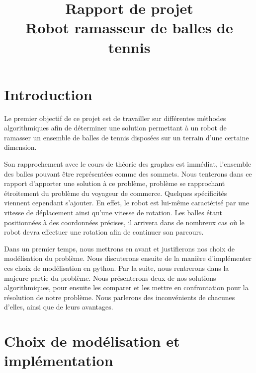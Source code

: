 \documentclass[12pt]{article}
\title{Rapport de projet \\ \textbf{Robot ramasseur de balles de tennis}}
\author{}
\date{}
\begin{document}
    \begin{titlepage}

        \begin{figure}
            \centering
            
        \end{figure}
        \maketitle

    \end{titlepage}

    \tableofcontents
    \pagebreak
    
    \section{Introduction}
    \label{sec:intro}

    Le premier objectif de ce projet est de travailler sur différentes méthodes algorithmiques afin de déterminer une solution permettant à un robot de ramasser un ensemble de balles de tennis disposées sur un terrain d'une certaine dimension.

    Son rapprochement avec le cours de théorie des graphes est immédiat, l'ensemble des balles pouvant être représentées comme des sommets. Nous tenterons dans ce rapport d'apporter une solution à ce problème, problème se rapprochant étroitement du problème du voyageur de commerce.
    Quelques spécificités viennent cependant s'ajouter. En effet, le robot est lui-même caractérisé par une vitesse de déplacement ainsi qu'une vitesse de rotation. Les balles étant positionnées à des coordonnées précises, il arrivera dans de nombreux cas où le robot devra effectuer une rotation afin de continuer son parcours.

    Dans un premier temps, nous mettrons en avant et justifierons nos choix de modélisation du problème. Nous discuterons ensuite de la manière d'implémenter ces choix de modélisation en python. Par la suite, nous rentrerons dans la majeure partie du problème. Nous présenterons deux de nos solutions algorithmiques, pour ensuite les comparer et les mettre en confrontation pour la résolution de notre problème. Nous parlerons des inconvénients de chacunes d'elles, ainsi que de leurs avantages.

    \section{Choix de modélisation et implémentation}
    \label{sec:model_impl}
\end{document}
